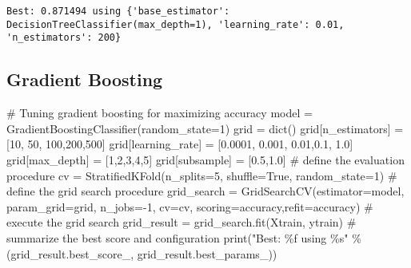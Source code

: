 \documentclass[
  letterpaper,
  DIV=11,
  numbers=noendperiod]{scrreprt}
\newenvironment{Shaded}{\begin{snugshade}}{\end{snugshade}}
\newcommand{\BuiltInTok}[1]{\textcolor[rgb]{0.00,0.23,0.31}{#1}}
\newcommand{\CommentTok}[1]{\textcolor[rgb]{0.37,0.37,0.37}{#1}}
\newcommand{\DecValTok}[1]{\textcolor[rgb]{0.68,0.00,0.00}{#1}}
\newcommand{\FloatTok}[1]{\textcolor[rgb]{0.68,0.00,0.00}{#1}}
\newcommand{\NormalTok}[1]{\textcolor[rgb]{0.00,0.23,0.31}{#1}}
\newcommand{\OperatorTok}[1]{\textcolor[rgb]{0.37,0.37,0.37}{#1}}
\newcommand{\SpecialCharTok}[1]{\textcolor[rgb]{0.37,0.37,0.37}{#1}}
\newcommand{\StringTok}[1]{\textcolor[rgb]{0.13,0.47,0.30}{#1}}
\newcommand{\VariableTok}[1]{\textcolor[rgb]{0.07,0.07,0.07}{#1}}
\begin{document}
\begin{verbatim}
Best: 0.871494 using {'base_estimator': DecisionTreeClassifier(max_depth=1), 'learning_rate': 0.01, 'n_estimators': 200}
\end{verbatim}

\subsection*{Gradient Boosting}\label{gradient-boosting-1}

\begin{Shaded}
\begin{Highlighting}[]
\CommentTok{\# Tuning gradient boosting for maximizing accuracy}
\NormalTok{model }\OperatorTok{=}\NormalTok{ GradientBoostingClassifier(random\_state}\OperatorTok{=}\DecValTok{1}\NormalTok{)}
\NormalTok{grid }\OperatorTok{=} \BuiltInTok{dict}\NormalTok{()}
\NormalTok{grid[}\StringTok{\textquotesingle{}n\_estimators\textquotesingle{}}\NormalTok{] }\OperatorTok{=}\NormalTok{ [}\DecValTok{10}\NormalTok{, }\DecValTok{50}\NormalTok{, }\DecValTok{100}\NormalTok{,}\DecValTok{200}\NormalTok{,}\DecValTok{500}\NormalTok{]}
\NormalTok{grid[}\StringTok{\textquotesingle{}learning\_rate\textquotesingle{}}\NormalTok{] }\OperatorTok{=}\NormalTok{ [}\FloatTok{0.0001}\NormalTok{, }\FloatTok{0.001}\NormalTok{, }\FloatTok{0.01}\NormalTok{,}\FloatTok{0.1}\NormalTok{, }\FloatTok{1.0}\NormalTok{]}
\NormalTok{grid[}\StringTok{\textquotesingle{}max\_depth\textquotesingle{}}\NormalTok{] }\OperatorTok{=}\NormalTok{ [}\DecValTok{1}\NormalTok{,}\DecValTok{2}\NormalTok{,}\DecValTok{3}\NormalTok{,}\DecValTok{4}\NormalTok{,}\DecValTok{5}\NormalTok{]}
\NormalTok{grid[}\StringTok{\textquotesingle{}subsample\textquotesingle{}}\NormalTok{] }\OperatorTok{=}\NormalTok{ [}\FloatTok{0.5}\NormalTok{,}\FloatTok{1.0}\NormalTok{]}
\CommentTok{\# define the evaluation procedure}
\NormalTok{cv }\OperatorTok{=}\NormalTok{ StratifiedKFold(n\_splits}\OperatorTok{=}\DecValTok{5}\NormalTok{, shuffle}\OperatorTok{=}\VariableTok{True}\NormalTok{, random\_state}\OperatorTok{=}\DecValTok{1}\NormalTok{)}
\CommentTok{\# define the grid search procedure}
\NormalTok{grid\_search }\OperatorTok{=}\NormalTok{ GridSearchCV(estimator}\OperatorTok{=}\NormalTok{model, param\_grid}\OperatorTok{=}\NormalTok{grid, n\_jobs}\OperatorTok{={-}}\DecValTok{1}\NormalTok{, cv}\OperatorTok{=}\NormalTok{cv, scoring}\OperatorTok{=}\StringTok{\textquotesingle{}accuracy\textquotesingle{}}\NormalTok{,refit}\OperatorTok{=}\StringTok{\textquotesingle{}accuracy\textquotesingle{}}\NormalTok{)}
\CommentTok{\# execute the grid search}
\NormalTok{grid\_result }\OperatorTok{=}\NormalTok{ grid\_search.fit(Xtrain, ytrain)}
\CommentTok{\# summarize the best score and configuration}
\BuiltInTok{print}\NormalTok{(}\StringTok{"Best: }\SpecialCharTok{\%f}\StringTok{ using }\SpecialCharTok{\%s}\StringTok{"} \OperatorTok{\%}\NormalTok{ (grid\_result.best\_score\_, grid\_result.best\_params\_))}
\end{Highlighting}
\end{Shaded}
\end{document}
